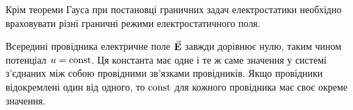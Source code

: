 \begin{remark}
	Крім теореми Гауса при постановці граничних задач електростатики необхідно враховувати різні граничні режими електростатичного поля.
\end{remark}

\begin{example}
	Всередині провідника електричне поле ${\vec{\mathbf{E}}}$ завжди дорівнює нулю, таким чином потенціал $u = \operatorname{const}$. Ця константа має одне і те ж саме значення у системі з'єднаних між собою провідними зв'язками провідників. Якщо провідники відокремлені один від одного, то $\operatorname{const}$ для кожного провідника має своє окреме значення.
\end{example}

% 